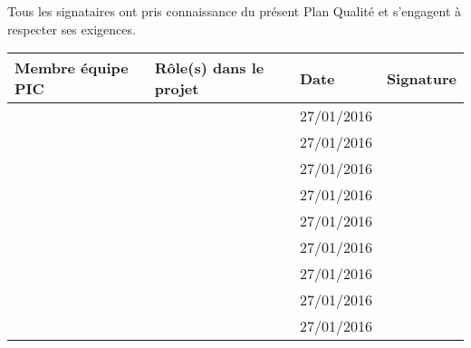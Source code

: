Tous les signataires ont pris connaissance du présent Plan Qualité et s'engagent à respecter ses exigences. \\
	
	\vspace{1cm}

\begin{tabular}[h]{|p{}|p{}|p{}|p{}|}
	\hline
	
	\cellcolor{gray!40}Membre équipe PIC & \cellcolor{gray!40}Rôle(s) dans le projet & \cellcolor{gray!40}Date & \cellcolor{gray!40}Signature \\\hline
	\Sergi & \CP & 27/01/2016 &  \\\hline
	\Pierre & \RQ \newline \CPA & 27/01/2016 &  \\\hline
	\Michel & \D \newline \RD & 27/01/2016 &  \\\hline
	\Kafui & \D \newline \RQA & 27/01/2016 &  \\\hline
	\Matthieu & \D \newline \RRS & 27/01/2016 &  \\\hline
	\Mathieu & \D \newline \RGC & 27/01/2016 &  \\\hline
	\Melissa & \D & 27/01/2016 &  \\\hline
	\Julie & \D & 27/01/2016 &  \\\hline
	\Florian & \D & 27/01/2016 &  \\\hline
\end{tabular}
